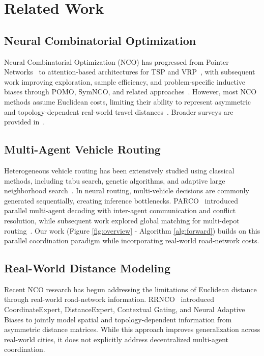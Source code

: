 \documentclass[journal,twoside,web]{ieeecolor}
\theoremstyle{definition}
\theoremstyle{remark}
\theoremstyle{definition}
\begin{document}
\section{Related Work}

\subsection{Neural Combinatorial Optimization}

Neural Combinatorial Optimization (NCO) has progressed from Pointer Networks~\cite{vinyals2015pointer} to attention-based architectures for TSP and VRP~\cite{kool2019attention,vaswani2017attention}, with subsequent work improving exploration, sample efficiency, and problem-specific inductive biases through POMO, SymNCO, and related approaches~\cite{kwon2020pomo,kim2022symnco,joshi2019efficient,hottung2022efficient}. However, most NCO methods assume Euclidean costs, limiting their ability to represent asymmetric and topology-dependent real-world travel distances~\cite{geisler2022generalization}. Broader surveys are provided in~\cite{mazyavkina2021reinforcement,cappart2023combinatorial}.

\subsection{Multi-Agent Vehicle Routing}

Heterogeneous vehicle routing has been extensively studied using classical methods, including tabu search, genetic algorithms, and adaptive large neighborhood search~\cite{glover1986future,gendreau2010tabu,ropke2006adaptive,koç2016heterogeneous}. In neural routing, multi-vehicle decisions are commonly generated sequentially, creating inference bottlenecks. PARCO~\cite{parco2024} introduced parallel multi-agent decoding with inter-agent communication and conflict resolution, while subsequent work explored global matching for multi-depot routing~\cite{son2024learning}. Our work (Figure \ref{fig:overview} - Algorithm \ref{alg:forward}) builds on this parallel coordination paradigm while incorporating real-world road-network costs.

\subsection{Real-World Distance Modeling}

Recent NCO research has begun addressing the limitations of Euclidean distance through real-world road-network information. RRNCO~\cite{rrnco2025} introduced CoordinateExpert, DistanceExpert, Contextual Gating, and Neural Adaptive Biases to jointly model spatial and topology-dependent information from asymmetric distance matrices. While this approach improves generalization across real-world cities, it does not explicitly address decentralized multi-agent coordination.
\end{document}

